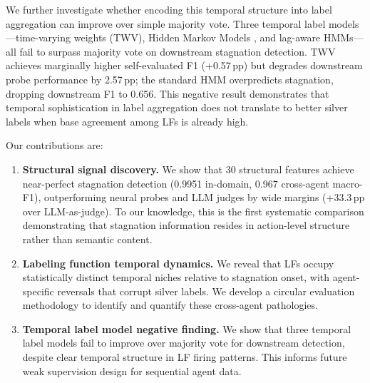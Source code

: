 We further investigate whether encoding this temporal structure into label aggregation can improve over simple majority vote.
Three temporal label models---time-varying weights (TWV), Hidden Markov Models \citep{safranchik2020linkedhmm}, and lag-aware HMMs---all fail to surpass majority vote on downstream stagnation detection.
TWV achieves marginally higher self-evaluated F1 (+0.57\,pp) but degrades downstream probe performance by 2.57\,pp; the standard HMM overpredicts stagnation, dropping downstream F1 to 0.656.
This negative result demonstrates that temporal sophistication in label aggregation does not translate to better silver labels when base agreement among LFs is already high.

Our contributions are:
\begin{enumerate}[leftmargin=*,itemsep=2pt]
    \item \textbf{Structural signal discovery.} We show that 30 structural features achieve near-perfect stagnation detection (0.9951 in-domain, 0.967 cross-agent macro-F1), outperforming neural probes and LLM judges by wide margins (+33.3\,pp over LLM-as-judge). To our knowledge, this is the first systematic comparison demonstrating that stagnation information resides in action-level structure rather than semantic content.
    \item \textbf{Labeling function temporal dynamics.} We reveal that LFs occupy statistically distinct temporal niches relative to stagnation onset, with agent-specific reversals that corrupt silver labels. We develop a circular evaluation methodology to identify and quantify these cross-agent pathologies.
    \item \textbf{Temporal label model negative finding.} We show that three temporal label models fail to improve over majority vote for downstream detection, despite clear temporal structure in LF firing patterns. This informs future weak supervision design for sequential agent data.
\end{enumerate}
